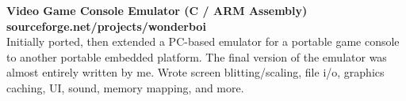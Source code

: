   \item 
  \headerrow 
  {\textbf{Video Game Console Emulator (C / ARM Assembly)}}
  {\textbf{sourceforge.net/projects/wonderboi}}
  \\
  Initially ported, then extended a PC-based emulator for a portable game console to another portable embedded platform. The final version of the emulator was almost entirely written by me. Wrote screen blitting/scaling, file i/o, graphics caching, UI, sound, memory mapping, and more.

